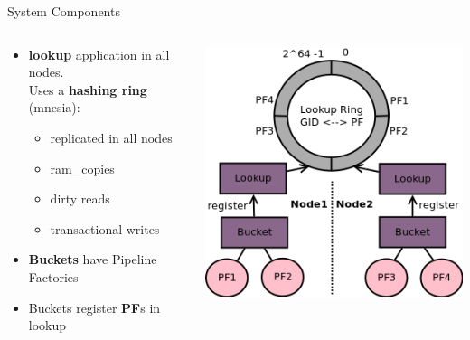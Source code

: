 \documentclass[aspectratio=169]{beamer}
\begin{document}
\begin{frame}{System Components}
    \begin{columns}
        \begin{column}[c]{0.5\textwidth}
            \begin{itemize}
                \item \textbf{lookup} application in all nodes.\\
                      Uses a \textbf{hashing ring} (mnesia):
                            \begin{itemize}
                                \item replicated in all nodes
                                \item ram\_copies
                                \item dirty reads
                                \item transactional writes
                            \end{itemize}
                \item \textbf{Buckets} have Pipeline Factories
                \item Buckets register \textbf{PF}s in lookup
            \end{itemize}
        \end{column}
        \begin{column}[c]{0.5\textwidth}
            \includegraphics[height=0.75\textheight]{images/components.png}
        \end{column}
    \end{columns}
\end{frame}
\end{document}

